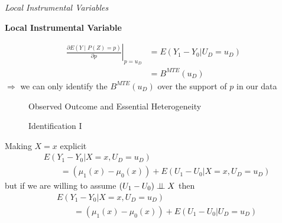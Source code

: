 \begin{frame}\begin{center}
\LARGE\textit{Local Instrumental Variables}
\end{center}\end{frame}
\begin{frame}\textbf{Local Instrumental Variable}

\begin{align*}
\left.\frac{\partial E(Y\mid P(Z) = p)}{\partial p}\right|_{p=u_D} & = E(Y_1 - Y_0 | U_D = u_D ) \\
        & =  B^{MTE} (u_D)
\end{align*}
$\Rightarrow$ we can only identify the $B^{MTE} (u_D)$ over the support of $p$ in our data
\end{frame}
\begin{frame}
\begin{figure}\caption{Observed Outcome and Essential Heterogeneity}
\end{figure}
\end{frame}
\begin{frame}
\begin{figure}\caption{Identification I}
\end{figure}
\end{frame}
\begin{frame}
Making $X = x$ explicit
\begin{align*}
 &E(Y_1 - Y_0 | X = x, U_D = u_D ) \\
 &\qquad= (\mu_1(x) - \mu_0(x)) + E(U_1 - U_0 | X = x, U_D = u_D )
\end{align*}
but if we are willing to assume $(U_1 - U_0)\indep X$ then
\begin{align*}
 &E(Y_1 - Y_0 | X = x, U_D = u_D ) \\
 &\qquad= (\mu_1(x) - \mu_0(x)) + E(U_1 - U_0 | U_D = u_D )
\end{align*}
\end{frame}
